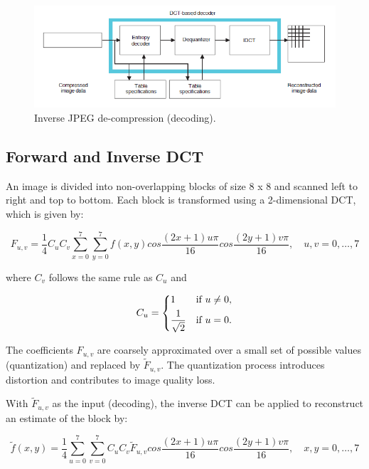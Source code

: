 \documentclass[11pt,a4paper]{article}
\begin{document}
\begin{figure}[ht]
\centering
\includegraphics[width=\textwidth]{reverse}
\caption{Inverse JPEG de-compression (decoding).}
\end{figure}

\subsection{Forward and Inverse DCT}
An image is divided into non-overlapping blocks of size 8 x 8 and scanned left to right and top to bottom. Each block is transformed using a 2-dimensional DCT, which is given by:

\begin{equation}
F_{u,v} = \frac{1}{4}C_u C_v \sum_{x=0}^{7} \sum_{y=0}^{7}
	f(x,y)cos\frac{(2x+1)u\pi}{16}cos\frac{(2y+1)v\pi}{16}, \quad u,v = 0,\ldots ,7
\end{equation}

where $C_v$ follows the same rule as $C_u$ and

\begin{align*}
C_u = 
	\begin{dcases}
		1 \quad &\text{if $u\neq 0$,} \\
		\frac{1}{\sqrt{2}} &\text{if $u = 0$.}
	\end{dcases}
\end{align*}

The coefficients $F_{u,v}$ are coarsely approximated over a small set of possible values (quantization) and replaced by $\tilde{F}_{u,v}$. The quantization process introduces distortion and contributes to image quality loss.

With $\tilde{F}_{u,v}$ as the input (decoding), the inverse DCT can be applied to reconstruct an estimate of the block by:

\begin{equation}
\tilde{f}(x,y) = \frac{1}{4}  \sum_{u=0}^{7} \sum_{v=0}^{7} C_u C_v
\tilde{F}_{u,v} cos\frac{(2x+1)u\pi}{16} cos\frac{(2y+1)v\pi}{16}, \quad x,y=0,\ldots ,7
\end{equation}
\end{document}

